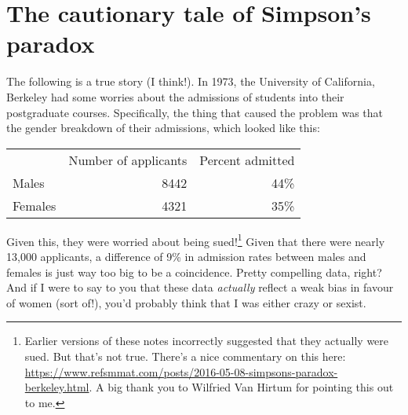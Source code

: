 \section{The cautionary tale of Simpson's paradox}



The following is a true story (I think!). In 1973, the University of California, Berkeley had some worries about the admissions of students into their postgraduate courses. Specifically, the thing that caused the problem was that the gender breakdown of their admissions, which looked like this:
\begin{center}
\begin{tabular}{lrr}
\hline
~       & Number of applicants & Percent admitted \\
\cline{2-3}
Males   &                 8442 &             44\% \\
Females &                 4321 &             35\% \\
\hline
\end{tabular}
\end{center}
Given this, they were worried about being sued!\footnote{Earlier versions of these notes incorrectly suggested that they actually were sued. But that's not true. There's a nice commentary on this here: \url{https://www.refsmmat.com/posts/2016-05-08-simpsons-paradox-berkeley.html}. A big thank you to Wilfried Van Hirtum for pointing this out to me.} Given that there were nearly 13,000 applicants, a difference of 9\% in admission rates between males and females is just way too big to be a coincidence. Pretty compelling data, right? And if I were to say to you that these data {\it actually} reflect a weak bias in favour of women (sort of!), you'd probably think that I was either crazy or sexist. 

